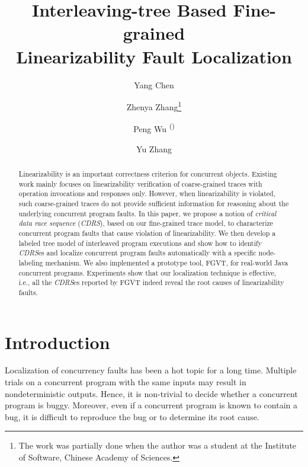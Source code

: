 \documentclass[runningheads]{llncs}
\begin{document}
%
\title{Interleaving-tree Based Fine-grained\\ Linearizability Fault Localization}
%
%
\author{Yang Chen \and
Zhenya Zhang\thanks{The work was partially done when the author was a student at the Institute of Software, Chinese Academy of Sciences.} \and
Peng Wu \textsuperscript{(\Letter)} \and
Yu Zhang}
%
%
%
\maketitle              %
%
\begin{abstract}
Linearizability is an important correctness criterion for concurrent objects. Existing work mainly focuses on linearizability verification of coarse-grained traces with operation invocations and responses only. However, when linearizability is violated, such coarse-grained traces do not provide sufficient information for reasoning about the underlying concurrent program faults. In this paper, we propose a notion of \textit{critical data race sequence} (\textit{CDRS}), based on our fine-grained trace model, to characterize concurrent program faults that cause violation of linearizability. We then develop a labeled tree model of interleaved program executions and show how to identify \textit{CDRS}es and localize concurrent program faults automatically with a specific node-labeling mechanism. We also implemented a prototype tool, FGVT, for real-world Java concurrent programs. Experiments show that our localization technique is effective, i.e., all the \textit{CDRS}es reported by FGVT indeed reveal the root causes of linearizability faults.

\end{abstract}
%
%
%
%
%
\section{Introduction}\label{sec:introduction}
Localization of concurrency faults has been a hot topic for a long time. 
Multiple trials on a concurrent program with the same inputs may result in nondeterministic outputs. Hence, it is non-trivial to decide whether a concurrent program is buggy. Moreover, even if a concurrent program is known to contain a bug, it is difficult to reproduce the bug or to determine its root cause.
\end{document}
